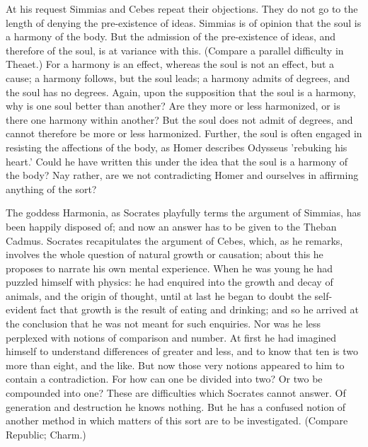 \documentclass[11pt,letter]{article}
\begin{document}
\par  At his request Simmias and Cebes repeat their objections. They do not go to the length of denying the pre-existence of ideas. Simmias is of opinion that the soul is a harmony of the body. But the admission of the pre-existence of ideas, and therefore of the soul, is at variance with this. (Compare a parallel difficulty in Theaet.) For a harmony is an effect, whereas the soul is not an effect, but a cause; a harmony follows, but the soul leads; a harmony admits of degrees, and the soul has no degrees. Again, upon the supposition that the soul is a harmony, why is one soul better than another? Are they more or less harmonized, or is there one harmony within another? But the soul does not admit of degrees, and cannot therefore be more or less harmonized. Further, the soul is often engaged in resisting the affections of the body, as Homer describes Odysseus 'rebuking his heart.' Could he have written this under the idea that the soul is a harmony of the body? Nay rather, are we not contradicting Homer and ourselves in affirming anything of the sort?

\par  The goddess Harmonia, as Socrates playfully terms the argument of Simmias, has been happily disposed of; and now an answer has to be given to the Theban Cadmus. Socrates recapitulates the argument of Cebes, which, as he remarks, involves the whole question of natural growth or causation; about this he proposes to narrate his own mental experience. When he was young he had puzzled himself with physics: he had enquired into the growth and decay of animals, and the origin of thought, until at last he began to doubt the self-evident fact that growth is the result of eating and drinking; and so he arrived at the conclusion that he was not meant for such enquiries. Nor was he less perplexed with notions of comparison and number. At first he had imagined himself to understand differences of greater and less, and to know that ten is two more than eight, and the like. But now those very notions appeared to him to contain a contradiction. For how can one be divided into two? Or two be compounded into one? These are difficulties which Socrates cannot answer. Of generation and destruction he knows nothing. But he has a confused notion of another method in which matters of this sort are to be investigated. (Compare Republic; Charm.)
\end{document}
